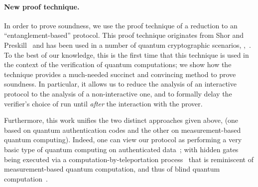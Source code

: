\documentclass{toc}
\begin{document}
\paragraph{New proof technique.} In order to prove soundness, we use the proof technique of a reduction to an ``entanglement-based'' protocol. This proof technique  originates from Shor and Preskill~\cite{SP00} and has been used in a number of quantum cryptographic scenarios, \eg,~\cite{DFSS05, DFPR14,FBS+14}. To the best of our knowledge, this is the first time that this technique is used in the context of the verification of quantum computations; we show how the technique provides a much-needed succinct and convincing method to prove soundness. In particular, it allows us to reduce the analysis of an interactive protocol to the analysis of a non-interactive one, and to formally delay the verifier's choice of run until \emph{after} the interaction with the prover.


Furthermore, this work unifies the two distinct approaches given above, (one based on quantum authentication codes and the other on measurement-based quantum computing). Indeed, one can view our protocol as performing a very basic type of quantum computing on authenticated data~\cite{BGS13}; with hidden gates being executed via a computation-by-teleportation process~\cite{GC99} that is reminiscent of measurement-based quantum computation, and thus of blind quantum computation~\cite{BFK09}.
\end{document}
